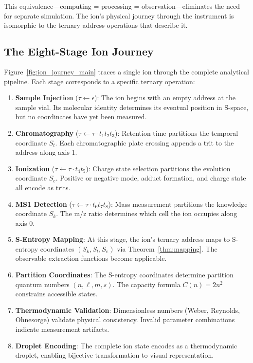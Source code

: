 \documentclass[twocolumn,10pt]{article}
\begin{document}
This equivalence---computing = processing = observation---eliminates the need for separate simulation. The ion's physical journey through the instrument is isomorphic to the ternary address operations that describe it.

\subsection{The Eight-Stage Ion Journey}

Figure~\ref{fig:ion_journey_main} traces a single ion through the complete analytical pipeline. Each stage corresponds to a specific ternary operation:

\begin{enumerate}[leftmargin=*]
\item \textbf{Sample Injection} ($\tau \gets \epsilon$): The ion begins with an empty address at the sample vial. Its molecular identity determines its eventual position in S-space, but no coordinates have yet been measured.

\item \textbf{Chromatography} ($\tau \gets \tau \cdot t_1 t_2 t_3$): Retention time partitions the temporal coordinate $S_t$. Each chromatographic plate crossing appends a trit to the address along axis 1.

\item \textbf{Ionization} ($\tau \gets \tau \cdot t_4 t_5$): Charge state selection partitions the evolution coordinate $S_e$. Positive or negative mode, adduct formation, and charge state all encode as trits.

\item \textbf{MS1 Detection} ($\tau \gets \tau \cdot t_6 t_7 t_8$): Mass measurement partitions the knowledge coordinate $S_k$. The m/z ratio determines which cell the ion occupies along axis 0.

\item \textbf{S-Entropy Mapping}: At this stage, the ion's ternary address maps to S-entropy coordinates $(S_k, S_t, S_e)$ via Theorem~\ref{thm:mapping}. The observable extraction functions become applicable.

\item \textbf{Partition Coordinates}: The S-entropy coordinates determine partition quantum numbers $(n, \ell, m, s)$. The capacity formula $C(n) = 2n^2$ constrains accessible states.

\item \textbf{Thermodynamic Validation}: Dimensionless numbers (Weber, Reynolds, Ohnesorge) validate physical consistency. Invalid parameter combinations indicate measurement artifacts.

\item \textbf{Droplet Encoding}: The complete ion state encodes as a thermodynamic droplet, enabling bijective transformation to visual representation.
\end{enumerate}
\end{document}
